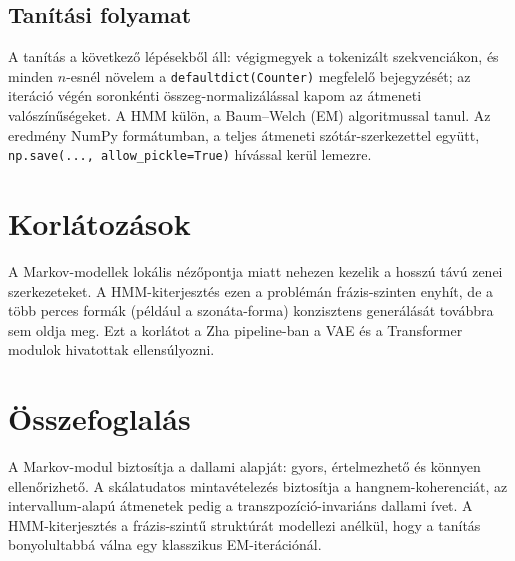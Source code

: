 \subsection{Tanítási folyamat}

A tanítás a következő lépésekből áll: végigmegyek a tokenizált szekvenciákon, és minden $n$-esnél növelem a \texttt{defaultdict(Counter)} megfelelő bejegyzését; az iteráció végén soronkénti összeg-normalizálással kapom az átmeneti valószínűségeket. A HMM külön, a Baum--Welch (EM) algoritmussal tanul. Az eredmény NumPy formátumban, a teljes átmeneti szótár-szerkezettel együtt, \texttt{np.save(..., allow\_pickle=True)} hívással kerül lemezre.

\section{Korlátozások}

A Markov-modellek lokális nézőpontja miatt nehezen kezelik a hosszú távú zenei szerkezeteket. A HMM-kiterjesztés ezen a problémán frázis-szinten enyhít, de a több perces formák (például a szonáta-forma) konzisztens generálását továbbra sem oldja meg. Ezt a korlátot a Zha pipeline-ban a VAE és a Transformer modulok hivatottak ellensúlyozni.

\section{Összefoglalás}

A Markov-modul biztosítja a dallami alapját: gyors, értelmezhető és könnyen ellenőrizhető. A skálatudatos mintavételezés biztosítja a hangnem-koherenciát, az intervallum-alapú átmenetek pedig a transzpozíció-invariáns dallami ívet. A HMM-kiterjesztés a frázis-szintű struktúrát modellezi anélkül, hogy a tanítás bonyolultabbá válna egy klasszikus EM-iterációnál.
